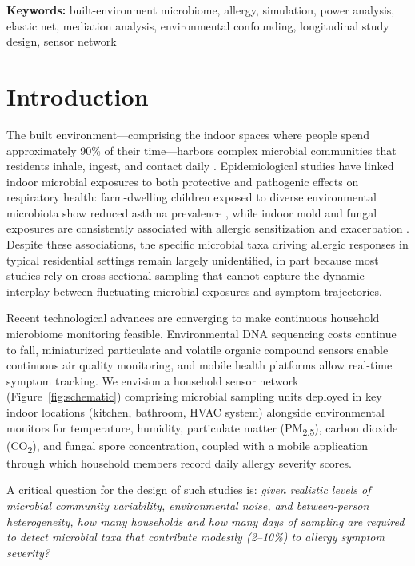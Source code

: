 \documentclass[11pt,letterpaper]{article}
\begin{document}
\textbf{Keywords:} built-environment microbiome, allergy, simulation, power analysis, elastic net, mediation analysis, environmental confounding, longitudinal study design, sensor network

\clearpage

\section{Introduction}

The built environment---comprising the indoor spaces where people spend approximately 90\% of their time---harbors complex microbial communities that residents inhale, ingest, and contact daily \citep{adams2015microbiota}. Epidemiological studies have linked indoor microbial exposures to both protective and pathogenic effects on respiratory health: farm-dwelling children exposed to diverse environmental microbiota show reduced asthma prevalence \citep{ege2011exposure}, while indoor mold and fungal exposures are consistently associated with allergic sensitization and exacerbation \citep{mendell2011respiratory}. Despite these associations, the specific microbial taxa driving allergic responses in typical residential settings remain largely unidentified, in part because most studies rely on cross-sectional sampling that cannot capture the dynamic interplay between fluctuating microbial exposures and symptom trajectories.

Recent technological advances are converging to make continuous household microbiome monitoring feasible. Environmental DNA sequencing costs continue to fall, miniaturized particulate and volatile organic compound sensors enable continuous air quality monitoring, and mobile health platforms allow real-time symptom tracking. We envision a household sensor network (Figure~\ref{fig:schematic}) comprising microbial sampling units deployed in key indoor locations (kitchen, bathroom, HVAC system) alongside environmental monitors for temperature, humidity, particulate matter (PM\textsubscript{2.5}), carbon dioxide (CO\textsubscript{2}), and fungal spore concentration, coupled with a mobile application through which household members record daily allergy severity scores.

A critical question for the design of such studies is: \emph{given realistic levels of microbial community variability, environmental noise, and between-person heterogeneity, how many households and how many days of sampling are required to detect microbial taxa that contribute modestly (2--10\%) to allergy symptom severity?}
\end{document}
